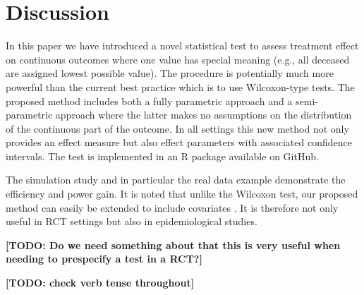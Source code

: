 \section{Discussion}\label{sec:discussion}

In this paper we have introduced a novel statistical test to assess treatment effect on continuous outcomes where one value has special meaning (e.g., all deceased are assigned lowest possible value). The procedure is potentially much more powerful than the current best practice which is to use Wilcoxon-type tests. The proposed method includes both a fully parametric approach and a semi-parametric approach where the latter makes no assumptions on the distribution of the continuous part of the outcome. In all settings this new method not only provides an effect measure but also effect parameters with associated confidence intervals. The test is implemented in an R package available on GitHub.

The simulation study and in particular the real data example demonstrate the efficiency and power gain. It is noted that unlike the Wilcoxon test, our proposed method can easily be extended to include covariates \citep{owen1991empirical}. It is therefore not only useful in RCT settings but also in epidemiological studies.

\textbf{[TODO: Do we need something about that this is very useful when needing to prespecify a test in a RCT?]}

\textbf{[TODO: check verb tense throughout]}
